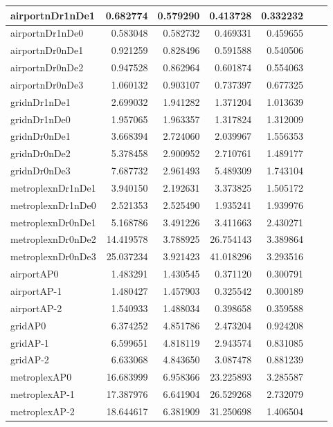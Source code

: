 \begin{longtable}{|l|r|r|r|r|r|r|}
\endlastfoot
airportnDr1nDe1 & 0.682774 & 0.579290 & 0.413728 & 0.332232 \\ \hline
airportnDr1nDe0 & 0.583048 & 0.582732 & 0.469331 & 0.459655 \\ \hline
airportnDr0nDe1 & 0.921259 & 0.828496 & 0.591588 & 0.540506 \\ \hline
airportnDr0nDe2 & 0.947528 & 0.862964 & 0.601874 & 0.554063 \\ \hline
airportnDr0nDe3 & 1.060132 & 0.903107 & 0.737397 & 0.677325 \\ \hline
gridnDr1nDe1 & 2.699032 & 1.941282 & 1.371204 & 1.013639 \\ \hline
gridnDr1nDe0 & 1.957065 & 1.963357 & 1.317824 & 1.312009 \\ \hline
gridnDr0nDe1 & 3.668394 & 2.724060 & 2.039967 & 1.556353 \\ \hline
gridnDr0nDe2 & 5.378458 & 2.900952 & 2.710761 & 1.489177 \\ \hline
gridnDr0nDe3 & 7.687732 & 2.961493 & 5.489309 & 1.743104 \\ \hline
metroplexnDr1nDe1 & 3.940150 & 2.192631 & 3.373825 & 1.505172 \\ \hline
metroplexnDr1nDe0 & 2.521353 & 2.525490 & 1.935241 & 1.939976 \\ \hline
metroplexnDr0nDe1 & 5.168786 & 3.491226 & 3.411663 & 2.430271 \\ \hline
metroplexnDr0nDe2 & 14.419578 & 3.788925 & 26.754143 & 3.389864 \\ \hline
metroplexnDr0nDe3 & 25.037234 & 3.921423 & 41.018296 & 3.293516 \\ \hline
airportAP0 & 1.483291 & 1.430545 & 0.371120 & 0.300791 \\ \hline
airportAP-1 & 1.480427 & 1.457903 & 0.325542 & 0.300189 \\ \hline
airportAP-2 & 1.540933 & 1.488034 & 0.398658 & 0.359588 \\ \hline
gridAP0 & 6.374252 & 4.851786 & 2.473204 & 0.924208 \\ \hline
gridAP-1 & 6.599651 & 4.818119 & 2.943574 & 0.831085 \\ \hline
gridAP-2 & 6.633068 & 4.843650 & 3.087478 & 0.881239 \\ \hline
metroplexAP0 & 16.683999 & 6.958366 & 23.225893 & 3.285587 \\ \hline
metroplexAP-1 & 17.387976 & 6.641904 & 26.529268 & 2.732079 \\ \hline
metroplexAP-2 & 18.644617 & 6.381909 & 31.250698 & 1.406504 \\ \hline

\end{longtable}
